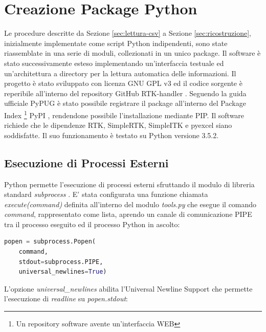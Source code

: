 \documentclass[a4paper,12pt, doubleside]{report}
\begin{document}
    \chapter{Creazione Package Python}
    \label{cap:rtk-handler}
        \par
            Le procedure descritte da Sezione \ref{sec:lettura-csv} a Sezione \ref{sec:ricostruzione}, inizialmente implementate come script Python indipendenti, sono state riassemblate in una serie di moduli, collezionati in un unico package. Il software è stato successivamente esteso implementando un'interfaccia testuale ed un'architettura a directory per la lettura automatica delle informazioni. Il progetto è stato sviluppato con licenza GNU GPL v3 \cite{gpl-v3} ed il codice sorgente è reperibile all'interno del repository GitHub RTK-handler \cite{rtk-handler-source}. Seguendo la guida ufficiale PyPUG \cite{python-packaging} è stato possibile registrare il package all'interno del Package Index \footnote{Un repository software avente un'interfaccia WEB} PyPI \cite{rtk-handler-pypi}, rendendone possibile l'installazione mediante PIP. Il software richiede che le dipendenze RTK, SimpleRTK, SimpleITK e pyexcel siano soddisfatte. Il suo funzionamento è testato su Python versione 3.5.2.
            
        \section{Esecuzione di Processi Esterni}
        \label{esecuzione-processi-esterni}
            \par
                Python permette l'esecuzione di processi esterni sfruttando il modulo di libreria standard \textit{subprocess} \cite{python-subprocess}. E' stata configurata una funzione chiamata \textit{execute(command)} definita all'interno del modulo \textit{tools.py} che esegue il comando \textit{command}, rappresentato come lista, aprendo un canale di comunicazione PIPE tra il processo eseguito ed il processo Python in ascolto:
                        
                \begin{lstlisting}[language=python, frame=bt]
popen = subprocess.Popen(
    command,
    stdout=subprocess.PIPE,
    universal_newlines=True)
                \end{lstlisting}
                        
                L'opzione \textit{universal\_newlines} abilita l'Universal Newline Support \cite{python-UNS} che permette l'esecuzione di \textit{readline} su \textit{popen.stdout}:
\end{document}
